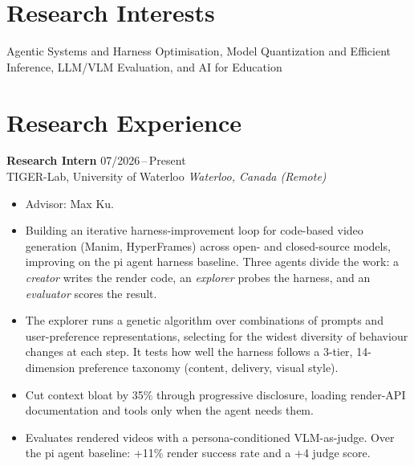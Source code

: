 \documentclass[11pt,a4paper]{article}
\begin{document}
\section{Research Interests}

Agentic Systems and Harness Optimisation,\; Model Quantization and Efficient Inference,\;
LLM/VLM Evaluation,\; and AI for Education


\section{Research Experience}

\textbf{Research Intern} \hfill 07/2026\,--\,Present\\
TIGER-Lab, University of Waterloo \hfill \textit{Waterloo, Canada (Remote)}
\begin{itemize}
  \item Advisor: Max Ku.
  \item Building an iterative harness-improvement loop for code-based video
        generation (Manim, HyperFrames) across open- and closed-source models,
        improving on the pi agent harness baseline. Three agents divide the work:
        a \emph{creator} writes the render code, an \emph{explorer} probes the
        harness, and an \emph{evaluator} scores the result.
  \item The explorer runs a genetic algorithm over combinations of prompts and
        user-preference representations, selecting for the widest diversity of
        behaviour changes at each step. It tests how well the harness follows a
        3-tier, 14-dimension preference taxonomy (content, delivery, visual style).
  \item Cut context bloat by 35\% through progressive disclosure, loading
        render-API documentation and tools only when the agent needs them.
  \item Evaluates rendered videos with a persona-conditioned VLM-as-judge.
        Over the pi agent baseline: +11\% render success rate and a +4 judge score.
\end{itemize}

\vspace{0.4em}
\end{document}
